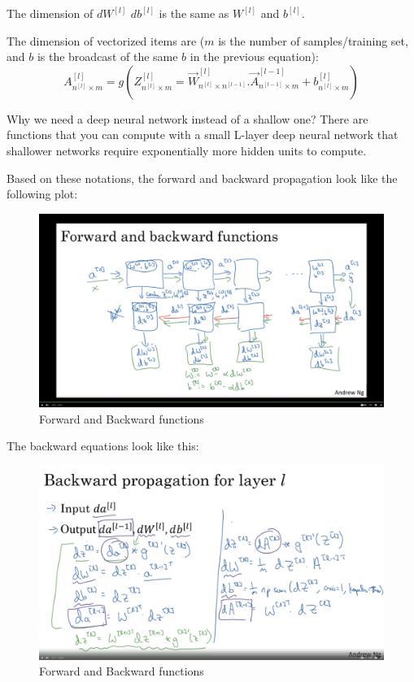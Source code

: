 \documentclass[12pt]{report}
\begin{document}
The dimension of $dW^{[l]}$ $db^{[l]}$ is the same as $W^{[l]}$ and $b^{[l]}$.

The dimension of vectorized items are ($m$ is the number of samples/training set, and $b$ is the broadcast of the same $b$ in the previous equation):
\begin{equation}
  A_{n^{[l]}\times m}^{[l]}= g( Z_{n^{[l]}\times m}^{[l]} = \overrightarrow{W}_{n^{[l]}\times n^{[l-1]}}^{[l]} . \overrightarrow{A}_{n^{[l-1]}\times m}^{[l-1]}+b_{n^{[l]}\times m}^{[l]})
\end{equation}




Why we need a deep neural network instead of a shallow one? There are functions that you can compute with a small L-layer deep neural network that shallower networks require exponentially more hidden units to compute.

Based on these notations, the forward and backward propagation look like the following plot:

\begin{figure}[H]
  \centering
  \includegraphics[trim =3.5cm 3.0cm 3.5cm 3.0cm, clip, scale=0.15]{pics/forwardbackward.png}
  \caption{Forward and Backward functions}
\end{figure}

The backward equations look like this:
\begin{figure}[H]
  \centering
  \includegraphics[trim =0.0cm 0.0cm 0.0cm 0.0cm, clip, scale=0.15]{pics/backwardeq.png}
  \caption{Forward and Backward functions}
\end{figure}
\end{document}
